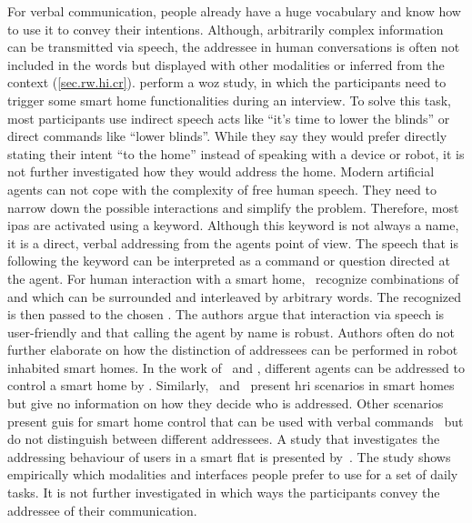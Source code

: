 For verbal communication, people already have a huge vocabulary and know how to use it to convey their intentions.
Although, arbitrarily complex information can be transmitted via speech, the \gls{addressee} in human \glspl{conversation} is often not included in the words but displayed with other modalities or inferred from the context (\cref{sec.rw.hi.cr}).
 perform a \gls{woz} study, in which the participants need to trigger some \gls{smart home} functionalities during an interview.
To solve this task, most participants use indirect speech acts like \enquote{it's time to lower the blinds} or direct commands like \enquote{lower blinds}.
While they say they would prefer directly stating their intent \enquote{to the home} instead of speaking with a \gls{device} or \gls{robot}, it is not further investigated how they would address the home.
Modern \glspl{artificial agent} can not cope with the complexity of free human speech.
They need to narrow down the possible interactions and simplify the problem.
Therefore, most \Glspl{ipa} are activated using a keyword.
Although this keyword is not always a name, it is a direct, verbal addressing from the agents point of view.
The speech that is following the keyword can be interpreted as a command or question directed at the agent.
For human interaction with a \gls{smart home},~ recognize combinations of  and  which can be surrounded and interleaved by arbitrary words.
The recognized  is then passed to the chosen .
The authors argue that interaction via speech is user-friendly and that calling the agent by name is robust.
Authors often do not further elaborate on how the distinction of \glspl{addressee} can be performed in \gls{robot} inhabited \glspl{smart home}.
In the work of~ and , different agents can be addressed to control a \gls{smart home} by .
Similarly,~ and~ present \gls{hri} scenarios in \glspl{smart home} but give no information on how they decide who is addressed.
Other scenarios present \glspl{gui} for \gls{smart home} control that can be used with verbal commands~\cite{Vanus2013,Zhao2016} but do not distinguish between different \glspl{addressee}.
A study that investigates the addressing behaviour of \naive{} users in a smart  flat is presented by~.
The study shows empirically which modalities and interfaces people prefer to use for a set of daily tasks.
It is not further investigated in which ways the participants convey the \gls{addressee} of their communication.

